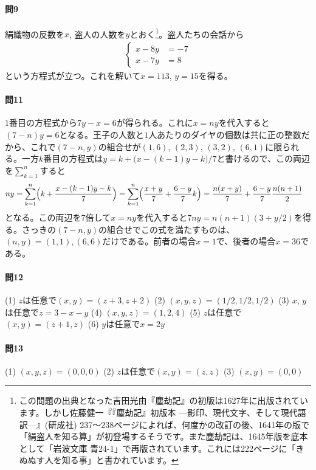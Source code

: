 \paragraph{問9} 絹織物の反数を$x$, 盗人の人数を$y$とおく\footnote{この問題の出典となった吉田光由『塵劫記』の初版は1627年に出版されています。しかし佐藤健一『『塵劫記』初版本 ---影印、現代文字、そして現代語訳---』(研成社) 237～238ページによれば、何度かの改訂の後、1641年の版で「絹盗人を知る算」が初登場するそうです。また塵劫記は、1645年版を底本として「岩波文庫 青24-1」で再版されています。これには222ページに「きぬぬす人を知る事」と書かれています。}。盗人たちの会話から
\begin{align*}
\begin{cases}
x - 8y &= -7 \\
x- 7y &= 8
\end{cases}
\end{align*}
という方程式が立つ。これを解いて$x = 113$, $y = 15$を得る。

\paragraph{問11} $1$番目の方程式から$7y - x = 6$が得られる。これに$x = ny$を代入すると$(7 - n)y = 6$となる。王子の人数と$1$人あたりのダイヤの個数は共に正の整数だから、これで$(7 - n, y)$の組合せが$(1, 6)$, $(2, 3)$, $(3, 2)$, $(6, 1)$に限られる。一方$k$番目の方程式は$y = k + \bigl(x - (k - 1)y - k\bigr)/7$と書けるので、この両辺を$\sum_{k = 1}^n$すると
\begin{align*}
ny &= \sum_{k = 1}^n \Bigl(k + \frac{x - (k - 1)y - k}{7}\Bigr)
= \sum_{k = 1}^n \Bigl(\frac{x + y}{7} + \frac{6 - y}{7} k\Bigr)
= \frac{n(x + y)}{7} + \frac{6 - y}{7}\frac{n(n + 1)}{2}
\end{align*}
となる。この両辺を$7$倍して$x = ny$を代入すると$7ny = n(n + 1)(3 + y/2)$を得る。さっきの$(7 - n, y)$の組合せでこの式を満たすものは、$(n, y) = (1, 1), (6, 6)$だけである。前者の場合$x = 1$で、後者の場合$x = 36$である。

\paragraph{問12} (1) $z$は任意で$(x, y) = (z + 3, z + 2)$ \quad (2) $(x, y, z) = (1/2, 1/2, 1/2)$ \quad (3) $x$, $y$は任意で$z = 3 - x - y$ \quad (4) $(x, y, z) = (1, 2, 4)$ \quad (5) $z$は任意で$(x, y) = (z + 1, z)$ \quad (6) $y$は任意で$x = 2y$

\paragraph{問13} (1) $(x, y, z) = (0, 0, 0)$ \quad (2) $z$は任意で$(x, y)=(z, z)$ \quad (3) $(x, y) = (0, 0)$

